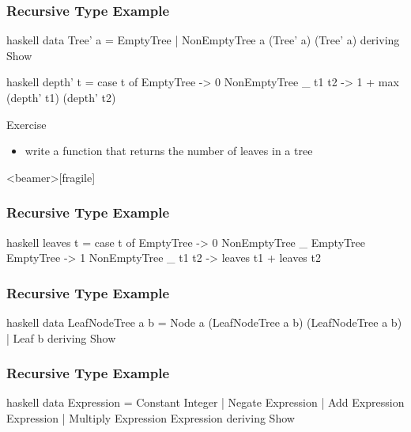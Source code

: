 \documentclass[dvipsnames]{beamer}
\theoremstyle{plain}
\begin{document}
\begin{frame}[fragile]
  \frametitle{Recursive Type Example}

  \begin{example}
    \begin{pygments}{haskell}
data Tree' a = EmptyTree
             | NonEmptyTree a (Tree' a) (Tree' a)
             deriving Show
    \end{pygments}

    \pause
    \begin{pygments}{haskell}
depth' t =
    case t of
      EmptyTree -> 0
      NonEmptyTree _ t1 t2 -> 1 + max (depth' t1) (depth' t2)
    \end{pygments}
  \end{example}

  \pause
  \begin{block}{Exercise}
    \begin{itemize}
      \item write a function that returns the number of leaves in a tree
    \end{itemize}
  \end{block}
\end{frame}

\begin{frame}<beamer>[fragile]
  \frametitle{Recursive Type Example}

  \begin{example}
    \pause
    \begin{pygments}{haskell}
leaves t =
    case t of
      EmptyTree -> 0
      NonEmptyTree _ EmptyTree EmptyTree -> 1
      NonEmptyTree _ t1 t2 -> leaves t1 + leaves t2
    \end{pygments}
  \end{example}
\end{frame}

\begin{frame}[fragile]
  \frametitle{Recursive Type Example}

  \begin{example}
    \begin{pygments}{haskell}
data LeafNodeTree a b =
    Node a (LeafNodeTree a b) (LeafNodeTree a b)
  | Leaf b
  deriving Show
    \end{pygments}
  \end{example}
\end{frame}

\begin{frame}[fragile]
  \frametitle{Recursive Type Example}

  \begin{example}
    \begin{pygments}{haskell}
data Expression = Constant Integer
                | Negate Expression
                | Add Expression Expression
                | Multiply Expression Expression
                deriving Show
    \end{pygments}
  \end{example}
\end{frame}
\end{document}
